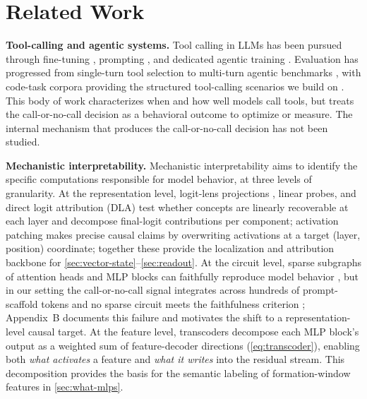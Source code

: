 \documentclass{article}
\begin{document}
\section{Related Work}
\label{sec:relatedwork}

\textbf{Tool-calling and agentic systems.}
Tool calling in LLMs has been pursued through fine-tuning
\citep{schick2023toolformer, patil2023gorilla, qin2023toolllm},
prompting \citep{yao2023react}, and dedicated agentic training
\citep{yang2025qwen3}.
Evaluation has progressed from single-turn tool selection
\citep{huang2024metatool, patil2025bfcl} to multi-turn agentic
benchmarks \citep{qi2025agentif, chen2025enhancing}, with code-task
corpora providing the structured tool-calling scenarios we build on
\citep{austin2021mbpp, hendrycks2021apps, chen2021codex,
li2022alphacode}.
This body of work characterizes when and how well models call tools,
but treats the call-or-no-call decision as a behavioral outcome to
optimize or measure.
The internal mechanism that produces the call-or-no-call decision has not been
studied.

\textbf{Mechanistic interpretability.}
Mechanistic interpretability aims to identify the specific computations
responsible for model behavior, at three levels of granularity.
At the representation level, logit-lens projections
\citep{belrose2023tunedlens}, linear probes, and direct logit
attribution (DLA) test whether concepts are linearly recoverable at
each layer and decompose final-logit contributions per component;
activation patching \citep{meng2022locating, heimersheim2024patching}
makes precise causal claims by overwriting activations at a target
(layer, position) coordinate; together these provide the localization
and attribution backbone for
\autoref{sec:vector-state}--\autoref{sec:readout}.
At the circuit level, sparse subgraphs of attention heads and MLP
blocks can faithfully reproduce model behavior \citep{conmy2023acdc,
syed2023attribution, anthropic2025circuit}, but in our setting the
call-or-no-call signal integrates across hundreds of prompt-scaffold
tokens and no sparse circuit meets the faithfulness criterion
\citep{hanna2024faithfulness}; Appendix~B documents this failure and
motivates the shift to a representation-level causal target.
At the feature level, transcoders \citep{dunefsky2024transcoders}
decompose each MLP block's output as a weighted sum of feature-decoder
directions (\autoref{eq:transcoder}), enabling both \emph{what
activates} a feature and \emph{what it writes} into the residual
	stream. This decomposition provides the basis for the semantic labeling
	of formation-window features in \autoref{sec:what-mlps}.
\end{document}
